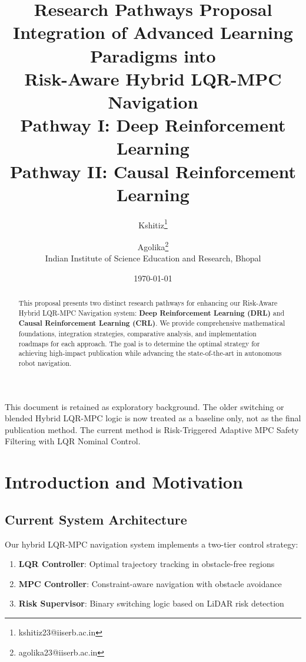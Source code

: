 \documentclass[11pt,a4paper]{article}
\title{%
  \textbf{Research Pathways Proposal}\\[0.5em]
  \Large Integration of Advanced Learning Paradigms into\\
  Risk-Aware Hybrid LQR-MPC Navigation\\[1em]
  \large \textcolor{drlcolor}{Pathway I: Deep Reinforcement Learning} \\
  \large \textcolor{crlcolor}{Pathway II: Causal Reinforcement Learning}
}
\author{
  Kshitiz\thanks{kshitiz23@iiserb.ac.in} \and
  Agolika\thanks{agolika23@iiserb.ac.in}\\[0.5em]
  \small Indian Institute of Science Education and Research, Bhopal
}
\date{\today}
\begin{document}
\maketitle

\begin{abstract}
This proposal presents two distinct research pathways for enhancing our Risk-Aware Hybrid LQR-MPC Navigation system: \textbf{Deep Reinforcement Learning (DRL)} and \textbf{Causal Reinforcement Learning (CRL)}. We provide comprehensive mathematical foundations, integration strategies, comparative analysis, and implementation roadmaps for each approach. The goal is to determine the optimal strategy for achieving high-impact publication while advancing the state-of-the-art in autonomous robot navigation.
\end{abstract}

\begin{warningbox}
This document is retained as exploratory background. The older switching or
blended Hybrid LQR-MPC logic is now treated as a baseline only, not as the final
publication method. The current method is Risk-Triggered Adaptive MPC Safety
Filtering with LQR Nominal Control.
\end{warningbox}

\tableofcontents
\newpage

\section{Introduction and Motivation}

\subsection{Current System Architecture}

Our hybrid LQR-MPC navigation system implements a two-tier control strategy:

\begin{enumerate}
  \item \textbf{LQR Controller}: Optimal trajectory tracking in obstacle-free regions
  \item \textbf{MPC Controller}: Constraint-aware navigation with obstacle avoidance
  \item \textbf{Risk Supervisor}: Binary switching logic based on LiDAR risk detection
\end{enumerate}
\end{document}
